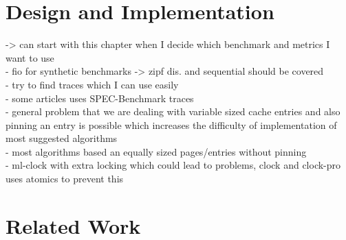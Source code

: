 \documentclass[
	12pt,
	a4paper,
	abstract,
	bibliography=totoc,
	chapterprefix,
	headings=openright,
	numbers=endperiod,
	parskip=half,
	twoside,
]{scrreprt}
\begin{document}
\chapter{Design and Implementation}
\label{cha:design and implementation}

-> can start with this chapter when I decide which benchmark and metrics I want to use\\
- fio for synthetic benchmarks -> zipf dis. and sequential should be covered\\
- try to find traces which I can use easily \\
- some articles uses SPEC-Benchmark traces\\

- general problem that we are dealing with variable sized cache entries and also \\
  pinning an entry is possible which increases the difficulty of implementation of most suggested algorithms\\
- most algorithms based an equally sized pages/entries without pinning\\
- ml-clock with extra locking which could lead to problems, clock and clock-pro uses atomics to prevent this


\chapter{Related Work}
\label{cha:related work}
%

% 
\end{document}
